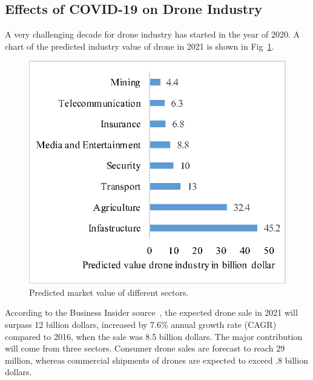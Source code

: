 \subsection{Effects of COVID-19 on Drone Industry}
A very challenging decade for drone industry has started in the year of 2020. A chart of the predicted industry value of drone in 2021 is shown in Fig~\ref{dronemarket}.
\begin{figure}[h!]
\centering
\includegraphics[width=.8\linewidth]{figure/dronemarket.eps}
\caption{Predicted market value of different sectors.}
\label{dronemarket}
\end{figure}
According to the Business Insider source~\cite{dronebusinessinsider}, the expected drone sale in 2021 will surpass 12 billion dollars, increased by 7.6\%  annual growth rate (CAGR) compared to 2016, when the sale was 8.5 billion dollars. %
The major contribution will come from three sectors. Consumer drone sales are forecast to reach 29 million, whereas commercial shipments of drones are expected to exceed .8 billion dollars. 

